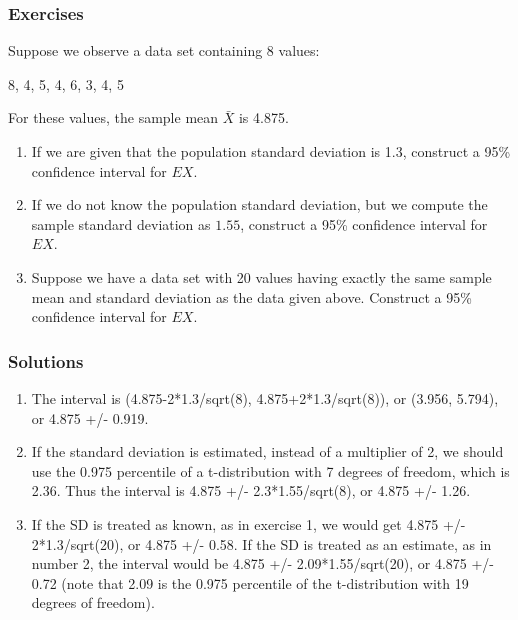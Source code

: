 \begin{frame}
\frametitle{Exercises}

Suppose we observe a data set containing 8 values:

\begin{center}
8, 4, 5, 4, 6, 3, 4, 5
\end{center}

For these values, the sample mean $\bar{X}$ is 4.875.

\begin{enumerate}

\item If we are given that the population standard deviation is 1.3,
 construct a 95\% confidence interval for $EX$.

\item If we do not know the population standard deviation, but we
 compute the sample standard deviation as $1.55$, construct a 95\%
 confidence interval for $EX$.

\item Suppose we have a data set with 20 values having exactly the
 same sample mean and standard deviation as the data given above.
 Construct a 95\% confidence interval for $EX$.

\end{enumerate}

\end{frame}

\begin{frame}
\frametitle{Solutions}

\begin{enumerate}

\item The interval is (4.875-2*1.3/sqrt(8), 4.875+2*1.3/sqrt(8)), or
 (3.956, 5.794), or 4.875 +/- 0.919.

\item If the standard deviation is estimated, instead of a multiplier
 of 2, we should use the 0.975 percentile of a t-distribution with 7
 degrees of freedom, which is 2.36.  Thus the interval is 4.875 +/-
 2.3*1.55/sqrt(8), or 4.875 +/- 1.26.

\item If the SD is treated as known, as in exercise 1, we would get
 4.875 +/- 2*1.3/sqrt(20), or 4.875 +/- 0.58.  If the SD is treated
 as an estimate, as in number 2, the interval would be 4.875 +/-
 2.09*1.55/sqrt(20), or 4.875 +/- 0.72 (note that 2.09 is the 0.975
 percentile of the t-distribution with 19 degrees of freedom).

\end{enumerate}

\end{frame}

